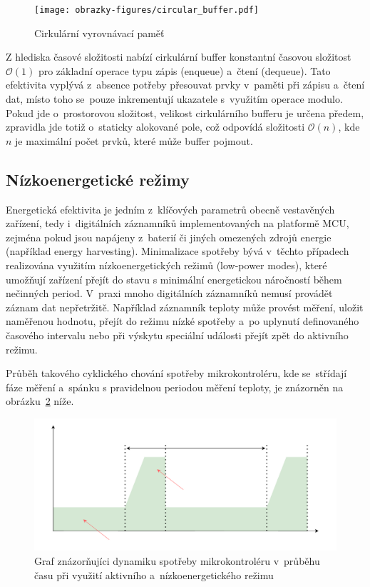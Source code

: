 \begin{figure}[h]
    \centering
    \texttt{[image: obrazky-figures/circular\_buffer.pdf]}
    
    \caption{Cirkulární vyrovnávací paměť}
    \label{fig:circular-buffer}
\end{figure}

Z hlediska časové složitosti nabízí cirkulární buffer konstantní časovou složitost $\mathcal{O}(1)$ pro základní operace typu zápis (enqueue) a~čtení (dequeue). Tato efektivita vyplývá z~absence potřeby přesouvat prvky v~paměti při zápisu a~čtení dat, místo toho se~pouze inkrementují ukazatele s~využitím operace modulo. Pokud jde o~prostorovou složitost, velikost cirkulárního bufferu je určena předem, zpravidla jde totiž o~staticky alokované pole, což odpovídá složitosti $\mathcal{O}(n)$, kde $n$ je maximální počet prvků, které může buffer pojmout.~\cite{petrungaro_ring_buffer_complexity}

\subsection{Nízkoenergetické režimy}
\label{nizko_energeticke_rezimy}
Energetická efektivita je jedním z~klíčových parametrů obecně vestavěných zařízení, tedy i~digitálních záznamníků implementovaných na platformě MCU, zejména pokud jsou napájeny z~baterií či jiných omezených zdrojů energie (například energy harvesting). Minimalizace spotřeby bývá v~těchto případech realizována využitím nízkoenergetických režimů (low-power modes), které umožňují zařízení přejít do stavu s minimální energetickou náročností během nečinných period. V~praxi mnoho digitálních záznamníků nemusí provádět záznam dat nepřetržitě. Například záznamník teploty může provést měření, uložit naměřenou hodnotu, přejít do režimu nízké spotřeby a~po uplynutí definovaného časového intervalu nebo při výskytu speciální události přejít zpět do aktivního režimu.~\cite{analog_devices_low_power_modes}

Průběh takového cyklického chování spotřeby mikrokontroléru, kde se~střídají fáze měření a~spánku s pravidelnou periodou měření teploty, je znázorněn na obrázku~\ref{fig:low-power-modes} níže.

\begin{figure}[h]
    \centering
    \includegraphics[width=1.00\textwidth]{obrazky-figures/low_power_modes-cz.pdf}
    
    \caption{Graf znázorňujíci dynamiku spotřeby mikrokontroléru v~průběhu času při využití aktivního a~nízkoenergetického režimu~\cite{analog_devices_low_power_modes}}
    \label{fig:low-power-modes}
\end{figure}

